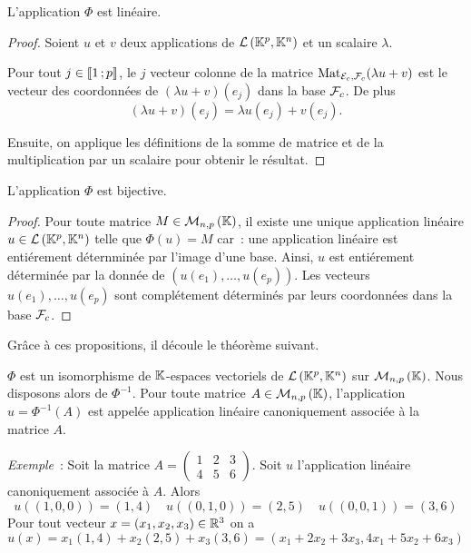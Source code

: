 \begin{prop}
  L'application \(\Phi\) est linéaire.
\end{prop}
\begin{proof}
  Soient \(u\) et \(v\) deux applications de \(\mathcal{L}\left(\mathbb{K}^p,\mathbb{K}^n\right)\) et un scalaire 
  \(\lambda\). 

  Pour tout \(j \in \mathopen{\llbracket}1\mathclose{}\mathpunct{};p\mathclose{\rrbracket}\), le \(j\)\ieme{} vecteur colonne 
  de la matrice \(\mathrm{Mat}_{\mathcal{E}_c,\mathcal{F}_c}(\lambda u+v)\) est le vecteur des coordonnées 
  de \((\lambda u+v)(e_j)\) dans la base \(\mathcal{F}_c\). De plus
  \begin{equation}
    (\lambda u+v)(e_j) = \lambda u(e_j) +v(e_j).
  \end{equation}

  Ensuite, on applique les définitions de la somme de matrice et de la 
  multiplication par un scalaire pour obtenir le résultat.
\end{proof}

\begin{prop}
  L'application \(\Phi\) est bijective.
\end{prop}
\begin{proof}
  Pour toute matrice \(M \in \mathcal{M}_{n,p}\left(\mathbb{K}\right)\), il existe une unique application 
  linéaire \(u \in \mathcal{L}\left(\mathbb{K}^p,\mathbb{K}^n\right)\) telle que \(\Phi(u)=M\) car~: une 
  application linéaire est entiérement déternminée par l'image d'une base. 
  Ainsi, \(u\) est entiérement déterminée par la donnée de \((u(e_1), \ldots, 
  u(e_p))\). Les vecteurs \(u(e_1), \ldots, u(e_p)\) sont complétement 
  déterminés par leurs coordonnées dans la base \(\mathcal{F}_c\).
\end{proof}

Grâce à ces propositions, il découle le théorème suivant.
\begin{theo}
  \(\Phi\) est un isomorphisme de \(\mathbb{K}\)-espaces vectoriels de 
  \(\mathcal{L}\left(\mathbb{K}^p,\mathbb{K}^n\right)\) sur \(\mathcal{M}_{n,p}\left(\mathbb{K}\right)\). Nous disposons alors de 
  \(\Phi^{-1}\). Pour toute matrice \(A \in \mathcal{M}_{n,p}\left(\mathbb{K}\right)\), l'application 
  \(u=\Phi^{-1}(A)\) est appelée application linéaire canoniquement associée à 
  la matrice \(A\).
\end{theo}

\emph{Exemple}~: Soit la matrice \(A=\begin{pmatrix} 1 & 2 & 3 \\ 4 & 5 & 6 
\end{pmatrix}\). Soit \(u\) l'application linéaire canoniquement associée à 
\(A\). Alors
\begin{equation}
  u((1,0,0))=(1,4) \quad u((0,1,0))=(2,5) \quad u((0,0,1))=(3,6)
\end{equation}
Pour tout vecteur \(x=(x_1,x_2,x_3) \in \mathbb{R}^3\) on a
\begin{equation}
  u(x)=x_1(1,4) + x_2(2,5) +x_3(3,6)=(x_1+2x_2+3x_3, 4x_1+5x_2+6x_3)
\end{equation}

